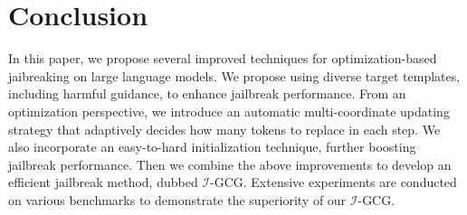 \section{Conclusion}
In this paper, we propose several improved techniques for optimization-based jaibreaking on large language models. We propose using diverse target templates, including harmful guidance, to enhance jailbreak performance. From an optimization perspective, we introduce an automatic multi-coordinate updating strategy that adaptively decides how many tokens to replace in each step. We also incorporate an easy-to-hard initialization technique, further boosting jailbreak performance. Then we combine the above improvements to develop an efficient jailbreak method, dubbed $\mathcal{I}$-GCG. Extensive experiments are conducted on various benchmarks to demonstrate the superiority of our $\mathcal{I}$-GCG.





